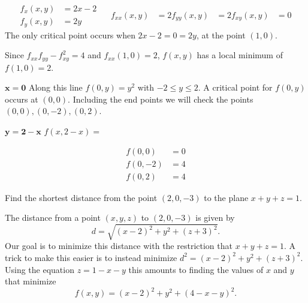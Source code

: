 \documentclass[12pt]{exam}
\begin{document}
\begin{questions}
\begin{solution}
            \begin{equation*}
                \begin{aligned}
                    f_x(x,y)&=2x-2\\
                    f_y(x,y)&=2y
                \end{aligned}~~~~
                \begin{aligned}
                    f_{xx}(x,y)&=2
                    f_{yy}(x,y)&=2
                    f_{xy}(x,y)&=0
                \end{aligned}
            \end{equation*}
            The only critical point occurs when \(2x-2=0=2y\), at the point \((1,0)\).

            Since \(f_{xx}f_{yy}-f_{xy}^2=4\) and \(f_{xx}(1,0)=2\), \(f(x,y)\) has a local minimum of \(f(1,0)=2\).

            \noindent \(\bm{x=0}\)
            Along this line \(f(0,y)=y^2\) with \(-2\le y\le2\). A critical point for \(f(0,y)\) occurs at \((0,0)\). 
            Including the end points we will check the points \((0,0),(0,-2),(0,2)\).

            \noindent \(\bm{y=2-x}\)
            \(f(x,2-x)= \)


            \begin{equation*}
                \begin{aligned}
                    f(0,0)&=0\\
                    f(0,-2)&=4\\
                    f(0,2)&=4
                \end{aligned}
            \end{equation*}
        \end{solution}
    \else
        \vfill
        \newpage
    \fi

\question Find the shortest distance from the point \((2,0,-3)\) to the plane \(x+y+z=1\).
    \ifprintanswers
        \begin{solution}
            The distance from a point \((x,y,z)\) to \((2,0,-3)\) is given by 
            \[
                d=\sqrt{(x-2)^2+y^2+(z+3)^2}.
            \]
            Our goal is to minimize this distance with the restriction that \(x+y+z=1\). A trick to make this easier is to instead minimize \(d^2=(x-2)^2+y^2+(z+3)^2\). Using the equation \(z=1-x-y\) this amounts to finding the values of \(x\)  and \(y\) that minimize
            \[
                f(x,y)=(x-2)^2+y^2+(4-x-y)^2.
            \]


\end{solution}
\end{questions}
\end{document}
